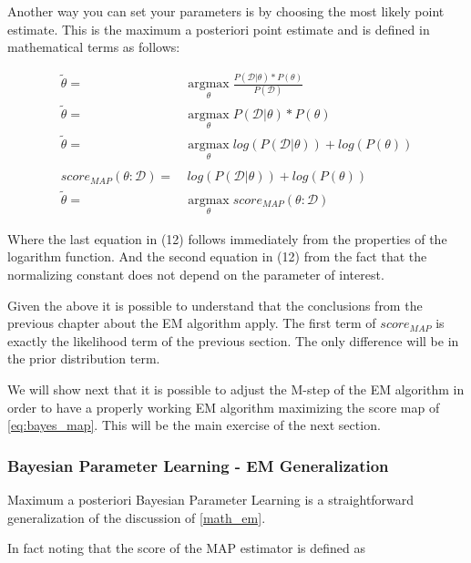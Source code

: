 \documentclass[11pt]{article}
\begin{document}
\begin{article}
Another way you can set your parameters is by choosing the most
likely point estimate. This is the maximum a posteriori point
estimate and is defined in mathematical terms as follows:

\begin{align} 
\tilde{\theta} =& \operatorname*{argmax}_{\theta} \frac{P (\mathscr{D} | \theta) * P(\theta)}{P (\mathscr{D})} \nonumber\\
\tilde{\theta} =& \operatorname*{argmax}_{\theta} P (\mathscr{D} | \theta) * P(\theta)\\ \label{eq:bayes_map}
\tilde{\theta} =& \operatorname*{argmax}_{\theta} log (P (\mathscr{D} | \theta)) + log (P(\theta)) \nonumber \\
\nonumber \\ 
score_{MAP} (\theta : \mathscr{D}) =& \ log (P (\mathscr{D} | \theta)) + log (P(\theta)) \nonumber\\
\tilde{\theta} =& \operatorname*{argmax}_{\theta} score_{MAP}(\theta : \mathscr{D})
\end{align}

Where the last equation in (12) follows immediately from the properties of
the logarithm function. And the second equation in (12) from the fact that
the normalizing constant does not depend on the parameter of
interest.

Given the above it is possible to understand that the conclusions
from the previous chapter about the EM algorithm apply. The first
term of \(score_{MAP}\) is exactly the likelihood term of the previous
section. The only difference will be in the prior distribution term.

We will show next that it is possible to adjust the M-step of the EM
algorithm in order to have a properly working EM algorithm
maximizing the score map of \ref{eq:bayes_map}. This will be the main
exercise of the next section.

\end{article}

\subsubsection{Bayesian Parameter Learning - EM Generalization}
\label{sec:org7adfef9}

Maximum a posteriori Bayesian Parameter Learning is a
straightforward generalization of the discussion of \ref{math_em}.

In fact noting that the score of the MAP estimator is defined as
\end{document}
